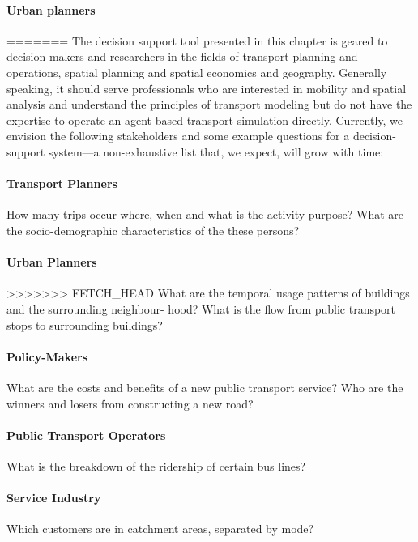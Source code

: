 \paragraph{Urban planners}
=======
The decision support tool presented in this chapter is geared to decision makers and researchers
in the fields of transport planning and operations, spatial planning and spatial economics and
geography. Generally speaking, it should serve professionals who are interested in mobility
and spatial analysis and understand the principles of transport modeling but do not have the
expertise to operate an agent-based transport simulation directly. Currently, we envision the
following stakeholders and some example questions for a decision-support system---a non-exhaustive list that, we expect, will grow with time:
\paragraph{Transport Planners}
How many trips occur where, when and what is the activity purpose?
What are the socio-demographic characteristics of the these persons?
\paragraph{Urban Planners}
>>>>>>> FETCH_HEAD
What are the temporal usage patterns of buildings and the surrounding neighbour-
hood?
What is the flow from public transport stops to surrounding buildings?
\paragraph{Policy-Makers}
What are the costs and benefits of a new public transport service?
Who are the winners and losers from constructing a new road?
\paragraph{Public Transport Operators}
What is the breakdown of the ridership of certain bus lines?
\paragraph{Service Industry}
Which customers are in catchment areas, separated by mode?

